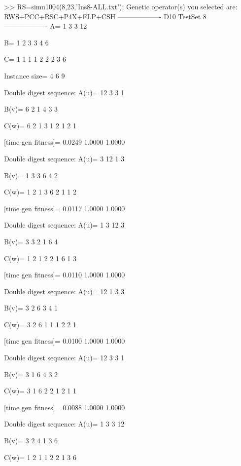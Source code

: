 >> RS=simu1004(8,23,'Ins8-ALL.txt');
Genetic operator(s) you selected are:
RWS+PCC+RSC+P4X+FLP+CSH
------------------- D10 TestSet 8 -------------------
A=
     1     3     3    12

B=
     1     2     3     3     4     6

C=
     1     1     1     1     2     2     2     3     6

Instance size=
     4     6     9

Double digest sequence:
A(u)=
    12     3     3     1

B(v)=
     6     2     1     4     3     3

C(w)=
     6     2     1     3     1     2     1     2     1

[time gen fitness]=
    0.0249    1.0000    1.0000

Double digest sequence:
A(u)=
     3    12     1     3

B(v)=
     1     3     3     6     4     2

C(w)=
     1     2     1     3     6     2     1     1     2

[time gen fitness]=
    0.0117    1.0000    1.0000

Double digest sequence:
A(u)=
     1     3    12     3

B(v)=
     3     3     2     1     6     4

C(w)=
     1     2     1     2     2     1     6     1     3

[time gen fitness]=
    0.0110    1.0000    1.0000

Double digest sequence:
A(u)=
    12     1     3     3

B(v)=
     3     2     6     3     4     1

C(w)=
     3     2     6     1     1     1     2     2     1

[time gen fitness]=
    0.0100    1.0000    1.0000

Double digest sequence:
A(u)=
    12     3     3     1

B(v)=
     3     1     6     4     3     2

C(w)=
     3     1     6     2     2     1     2     1     1

[time gen fitness]=
    0.0088    1.0000    1.0000

Double digest sequence:
A(u)=
     1     3     3    12

B(v)=
     3     2     4     1     3     6

C(w)=
     1     2     1     1     2     2     1     3     6

